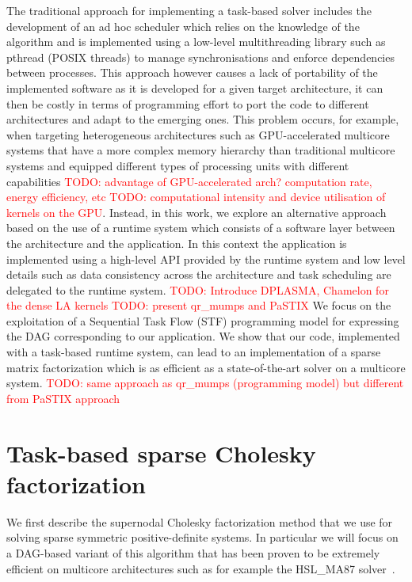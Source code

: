 \documentclass{article}
\newcommand{\alert}[1]{\textcolor{red}{#1}\xspace}
\newcommand{\TODO}[1]{\alert{TODO: #1}\xspace}
\newcommand{\ma}{HSL\_MA87\xspace}
\begin{document}
The traditional approach for implementing a task-based solver includes
the development of an ad hoc scheduler which relies on the knowledge
of the algorithm and is implemented using a low-level multithreading
library such as pthread (POSIX threads) to manage synchronisations and
enforce dependencies between processes. This approach however causes a
lack of portability of the implemented software as it is developed for
a given target architecture, it can then be costly in terms of
programming effort to port the code to different architectures and
adapt to the emerging ones. This problem occurs, for example, when
targeting heterogeneous architectures such as GPU-accelerated
multicore systems that have a more complex memory hierarchy than
traditional multicore systems and equipped different types of
processing units with different capabilities \TODO{advantage of
  GPU-accelerated arch? computation rate, energy efficiency, etc}
\TODO{computational intensity and device utilisation of kernels on the
  GPU}. Instead, in this work, we explore an alternative approach
based on the use of a runtime system which consists of a software
layer between the architecture and the application. In this context
the application is implemented using a high-level API provided by the
runtime system and low level details such as data consistency across
the architecture and task scheduling are delegated to the runtime
system. \TODO{Introduce DPLASMA, Chamelon for the dense LA kernels}
\TODO{present qr\_mumps and PaSTIX} We focus on the exploitation of a
Sequential Task Flow (STF) programming model for expressing the DAG
corresponding to our application. We show that our code, implemented
with a task-based runtime system, can lead to an implementation of a
sparse matrix factorization which is as efficient as a
state-of-the-art solver on a multicore system.  \TODO{same approach as
  qr\_mumps (programming model) but different from PaSTIX approach}

\section{Task-based sparse Cholesky factorization}\label{sec:chol}
\setcounter{equation}{0}
\setcounter{table}{0}
\setcounter{figure}{0}

We first describe the supernodal Cholesky factorization method that we
use for solving sparse symmetric positive-definite systems. In
particular we will focus on a DAG-based variant of this algorithm that
has been proven to be extremely efficient on multicore architectures
such as for example the \ma solver~\cite{h.r.s:10}.
\end{document}
